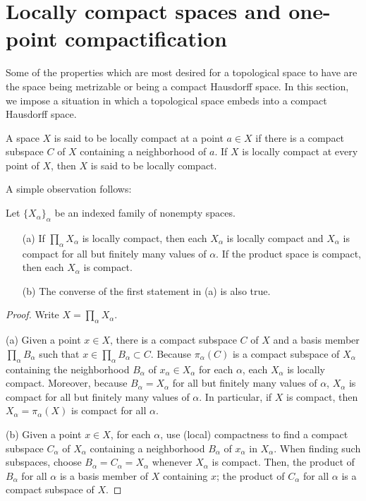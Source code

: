 \section{Locally compact spaces and one-point compactification}

Some of the properties which are most desired for a topological space to have are the space being metrizable or being a compact Hausdorff space.
In this section, we impose a situation in which a topological space embeds into a compact Hausdorff space.

\begin{defi}
    A space $X$ is said to be locally compact at a point $a\in X$ if there is a compact subspace $C$ of $X$ containing a neighborhood of $a$.
    If $X$ is locally compact at every point of $X$, then $X$ is said to be locally compact.
\end{defi}

A simple observation follows:
\begin{obs}
    Let $\{X_\alpha\}_\alpha$ be an indexed family of nonempty spaces.
    \begin{enumerate}
        \item[(a)]
        {
            If $\prod_\alpha X_\alpha$ is locally compact, then each $X_\alpha$ is locally compact and $X_\alpha$ is compact for all but finitely many values of $\alpha$.
            If the product space is compact, then each $X_\alpha$ is compact.
        }
        \item[(b)]
        {
            The converse of the first statement in (a) is also true.
        }
    \end{enumerate}
\end{obs}
\begin{proof}
    Write $X=\prod_\alpha X_\alpha$.

    \hangindent=0.65cm
    \noindent(a)
    Given a point $x\in X$, there is a compact subspace $C$ of $X$ and a basis member $\prod_\alpha B_\alpha$ such that $x\in\prod_\alpha B_\alpha\subset C$.
    Because $\pi_\alpha(C)$ is a compact subspace of $X_\alpha$ containing the neighborhood $B_\alpha$ of $x_\alpha\in X_\alpha$ for each $\alpha$, each $X_\alpha$ is locally compact.
    Moreover, because $B_\alpha=X_\alpha$ for all but finitely many values of $\alpha$, $X_\alpha$ is compact for all but finitely many values of $\alpha$.
    In particular, if $X$ is compact, then $X_\alpha=\pi_\alpha(X)$ is compact for all $\alpha$.
    
    \noindent(b)
    Given a point $x\in X$, for each $\alpha$, use (local) compactness to find a compact subspace $C_\alpha$ of $X_\alpha$ containing a neighborhood $B_\alpha$ of $x_\alpha$ in $X_\alpha$.
    When finding such subspaces, choose $B_\alpha=C_\alpha=X_\alpha$ whenever $X_\alpha$ is compact.
    Then, the product of $B_\alpha$ for all $\alpha$ is a basis member of $X$ containing $x$; the product of $C_\alpha$ for all $\alpha$ is a compact subspace of $X$.
\end{proof}

